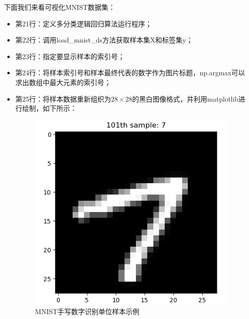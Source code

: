 \documentclass[UTF8]{article}
\begin{document}
下面我们来看可视化MNIST数据集：
\begin{itemize}
\item 第21行：定义多分类逻辑回归算法运行程序；
\item 第22行：调用load\_mnist\_ds方法获取样本集X和标签集y；
\item 第23行：指定要显示样本的索引号；
\item 第24行：将样本索引号和样本最终代表的数字作为图片标题，np.argmax可以求出数组中最大元素的索引号；
\item 第25行：将样本数据重新组织为$28\times28$的黑白图像格式，并利用matplotlib进行绘制，如下所示：
\begin{figure}[H]
	\caption{MNIST手写数字识别单位样本示例}
	\label{f000031}
	\centering
	\includegraphics[height=10cm]{images/f000031}
\end{figure}
\end{itemize}
\end{document}
